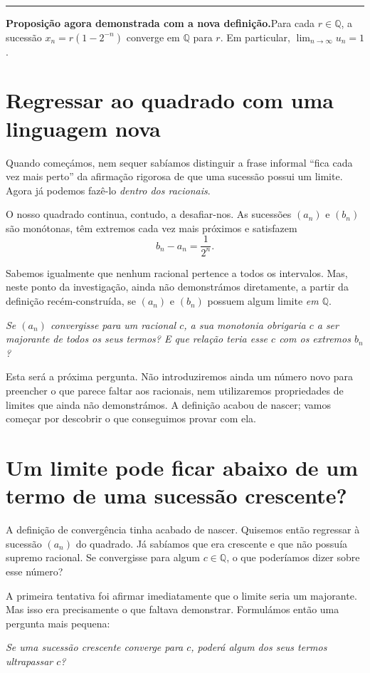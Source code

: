 \documentclass[11pt,a4paper]{article}
\newcommand{\Q}{\mathbb{Q}}
\newcommand{\questao}[1]{\par\medskip\noindent\textit{#1}\par\smallskip}
\newcommand{\assentado}[2]{%
\par\medskip\noindent\begingroup\color{azul}\rule{\linewidth}{0.45pt}\par\smallskip
\noindent\textbf{#1.}\enspace #2\par\endgroup\medskip}
\begin{document}
\assentado{Proposição agora demonstrada com a nova definição}{Para cada $r\in\Q$, a sucessão $x_n=r(1-2^{-n})$ converge em $\Q$ para $r$. Em particular, $\lim_{n\to\infty}u_n=1$.}

\section{Regressar ao quadrado com uma linguagem nova}

Quando começámos, nem sequer sabíamos distinguir a frase informal ``fica cada vez mais perto'' da afirmação rigorosa de que uma sucessão possui um limite. Agora já podemos fazê-lo \emph{dentro dos racionais}.

O nosso quadrado continua, contudo, a desafiar-nos. As sucessões $(a_n)$ e $(b_n)$ são monótonas, têm extremos cada vez mais próximos e satisfazem
\[
 b_n-a_n=\frac1{2^n}.
\]

Sabemos igualmente que nenhum racional pertence a todos os intervalos. Mas, neste ponto da investigação, ainda não demonstrámos diretamente, a partir da definição recém-construída, se $(a_n)$ e $(b_n)$ possuem algum limite \emph{em $\Q$}.

\questao{Se $(a_n)$ convergisse para um racional $c$, a sua monotonia obrigaria $c$ a ser majorante de todos os seus termos? E que relação teria esse $c$ com os extremos $b_n$?}

Esta será a próxima pergunta. Não introduziremos ainda um número novo para preencher o que parece faltar aos racionais, nem utilizaremos propriedades de limites que ainda não demonstrámos. A definição acabou de nascer; vamos começar por descobrir o que conseguimos provar com ela.

\section{Um limite pode ficar abaixo de um termo de uma sucessão crescente?}

A definição de convergência tinha acabado de nascer. Quisemos então regressar à sucessão $(a_n)$ do quadrado. Já sabíamos que era crescente e que não possuía supremo racional. Se convergisse para algum $c\in\Q$, o que poderíamos dizer sobre esse número?

A primeira tentativa foi afirmar imediatamente que o limite seria um majorante. Mas isso era precisamente o que faltava demonstrar. Formulámos então uma pergunta mais pequena:

\questao{Se uma sucessão crescente converge para $c$, poderá algum dos seus termos ultrapassar $c$?}
\end{document}
